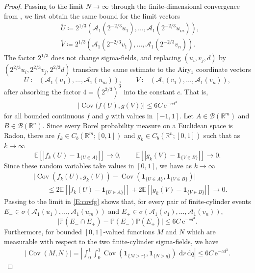 \documentclass[12pt, reqno]{amsart}
\numberwithin{equation}{section}
\theoremstyle{definition}
\newcommand{\R}{\mathbb{R}}
\newcommand{\E}{\mathbb{E}}
\newcommand{\Cov}{\operatorname{Cov}}
\newcommand{\Prob}{\mathbb{P}}
\newcommand{\dd}{\,\mathrm{d}}
\newcommand{\e}{\,\mathrm{e}}
\newcommand{\Acal}{\mathcal{A}}
\newcommand{\one}{\mathbf{1}}
\begin{document}
\begin{proof}
  Passing to the limit $N\to\infty$ through the finite-dimensional convergence
  from \cite[Theorem 1.4]{basu.bhattacharjee:24:limit}, we first obtain the same
  bound for the limit vectors
  \begin{align*}
    & \widetilde U \coloneqq 2^{1/3}(\Acal_1(2^{-2/3}u_1),\ldots,\Acal_1(2^{-2/3}u_m)), \\
    & \widetilde V \coloneqq 2^{1/3}(\Acal_1(2^{-2/3}v_1),\ldots,\Acal_1(2^{-2/3}v_n)).
  \end{align*}
  The factor $2^{1/3}$ does not change sigma-fields, and replacing $(u_i,v_j,d)$
  by $(2^{2/3}u_i,2^{2/3}v_j,2^{2/3}d)$ transfers the same estimate to the
  Airy$_1$ coordinate vectors
  \[
    U \coloneqq (\Acal_1(u_1),\ldots,\Acal_1(u_m)), \qquad
    V \coloneqq (\Acal_1(v_1),\ldots,\Acal_1(v_n)),
  \]
  after absorbing the factor $4=(2^{2/3})^3$ into the constant $c$.  That is,
  \begin{align}\label{E:covfg}
    \bigl|\Cov\bigl(f(U),g(V)\bigr)\bigr|
    \le 6C \e^{-c d^3}
  \end{align}
  for all bounded continuous $f$ and $g$ with values in $[-1,1]$. Let
  $A\in\mathcal B(\R^m)$ and $B\in\mathcal B(\R^n)$. Since every Borel
  probability measure on a Euclidean space is Radon, there are
  $f_k\in C_b(\R^m;[0,1])$ and $g_k\in C_b(\R^n;[0,1])$ such that as $k\to\infty$
  \[
    \E[|f_k(U)-\one_{\{U\in A\}}|]\longrightarrow0,\qquad
    \E[|g_k(V)-\one_{\{V\in B\}}|]\longrightarrow0.
  \]
  Since these random variables take values in $[0,1]$, we have as $k\to\infty$
  \begin{align*}
    &\big|\Cov(f_k(U),g_k(V))
       -\Cov(\one_{\{U\in A\}},\one_{\{V\in B\}})\big|\\
    &\qquad\le
      2\E[|f_k(U)-\one_{\{U\in A\}}|]
      +2\E[|g_k(V)-\one_{\{V\in B\}}|]\longrightarrow0.
  \end{align*}
  Passing to the limit in \eqref{E:covfg} shows that, for every pair of
  finite-cylinder events
  $E_-\in\sigma(\Acal_1(u_1),\ldots,\Acal_1(u_m))$ and
  $E_+\in\sigma(\Acal_1(v_1),\ldots,\Acal_1(v_n))$,
  \[
    \bigl|\Prob(E_-\cap E_+)-\Prob(E_-)\Prob(E_+)\bigr|
    \le 6C \e^{-c d^3}.
  \]
  Furthermore, for bounded $[0,1]$-valued functions $M$ and $N$ which are
  measurable with respect to the two finite-cylinder sigma-fields, we have
    \begin{align}\label{E:MN}
    |\Cov(M,N)|
    =
    \left|\int_0^1\int_0^1
    \Cov(\one_{\{M>r\}},\one_{\{N>q\}})\, \dd r\dd q\right| \leq 6C \e^{-c d^3}.
  \end{align}
  

\end{proof}
\end{document}
